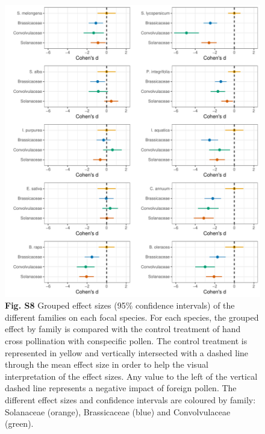 \documentclass[
  12pt,
]{article}
\begin{document}
\newpage

\begin{figure}
\centering
\includegraphics{Supp_Material_files/figure-latex/unnamed-chunk-11-1.pdf}
\caption{\textbf{Fig. S8} Grouped effect sizes (95\% confidence
intervals) of the different families on each focal species. For each
species, the grouped effect by family is compared with the control
treatment of hand cross pollination with conspecific pollen. The control
treatment is represented in yellow and vertically intersected with a
dashed line through the mean effect size in order to help the visual
interpretation of the effect sizes. Any value to the left of the
vertical dashed line represents a negative impact of foreign pollen. The
different effect sizes and confidence intervals are coloured by family:
Solanaceae (orange), Brassicaceae (blue) and Convolvulaceae (green).}
\end{figure}
\end{document}
